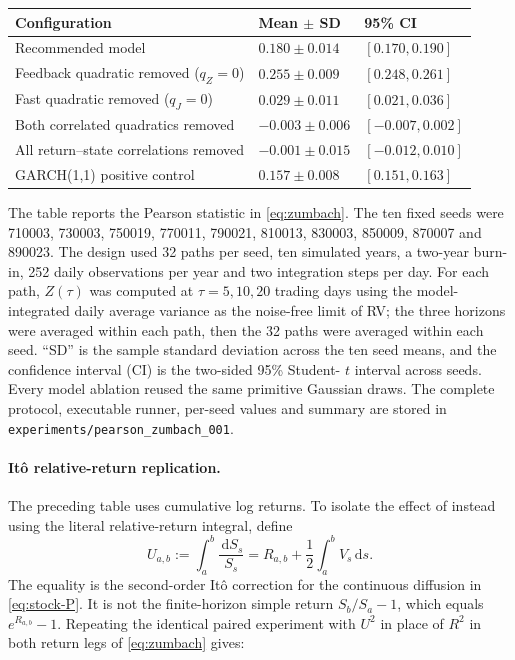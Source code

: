 \documentclass[11pt,a4paper]{article}
\newcommand{\dd}{\,\mathrm{d}}
\begin{document}
\begin{center}
\begin{tabularx}{0.96\textwidth}{@{}Y C{27mm} C{31mm}@{}}
\toprule
\textbf{Configuration} & \textbf{Mean \(\pm\) SD} & \textbf{95\% CI} \\
\midrule
Recommended model & \(0.180\pm0.014\) & \([0.170,0.190]\) \\
Feedback quadratic removed (\(q_Z=0\)) & \(0.255\pm0.009\) & \([0.248,0.261]\) \\
Fast quadratic removed (\(q_J=0\)) & \(0.029\pm0.011\) & \([0.021,0.036]\) \\
Both correlated quadratics removed & \(-0.003\pm0.006\) & \([-0.007,0.002]\) \\
All return--state correlations removed & \(-0.001\pm0.015\) & \([-0.012,0.010]\) \\
GARCH(1,1) positive control & \(0.157\pm0.008\) & \([0.151,0.163]\) \\
\bottomrule
\end{tabularx}
\end{center}

The table reports the Pearson statistic in \cref{eq:zumbach}.  The ten fixed seeds were
710003, 730003, 750019, 770011, 790021, 810013, 830003, 850009, 870007 and 890023.  The design
used 32 paths per seed, ten simulated years, a
two-year burn-in, 252 daily observations per year and two integration steps per day.  For each
path, \(Z(\tau)\) was computed at \(\tau=5,10,20\) trading days using the model-integrated daily
average variance as the noise-free limit of RV; the three horizons were averaged within each
path, then the 32 paths were averaged within each seed.  ``SD'' is the sample standard deviation
across the ten seed means, and the confidence interval (CI) is the two-sided 95\% Student-
\(t\) interval across seeds.  Every model ablation reused the same primitive Gaussian draws.
The complete protocol, executable runner, per-seed values and summary are stored in
\nolinkurl{experiments/pearson_zumbach_001}.

\paragraph{It\^o relative-return replication.}
The preceding table uses cumulative log returns.  To isolate the effect of instead using the
literal relative-return integral, define
\begin{equation}
U_{a,b}:=\int_a^b\frac{\dd S_s}{S_s}
=R_{a,b}+\frac12\int_a^bV_s\dd s.
\label{eq:ito-relative-return}
\end{equation}
The equality is the second-order It\^o correction for the continuous diffusion in
\cref{eq:stock-P}.  It is not the finite-horizon simple return \(S_b/S_a-1\), which equals
\(e^{R_{a,b}}-1\).  Repeating the identical paired experiment with \(U^2\) in place of
\(R^2\) in both return legs of \cref{eq:zumbach} gives:
\end{document}
